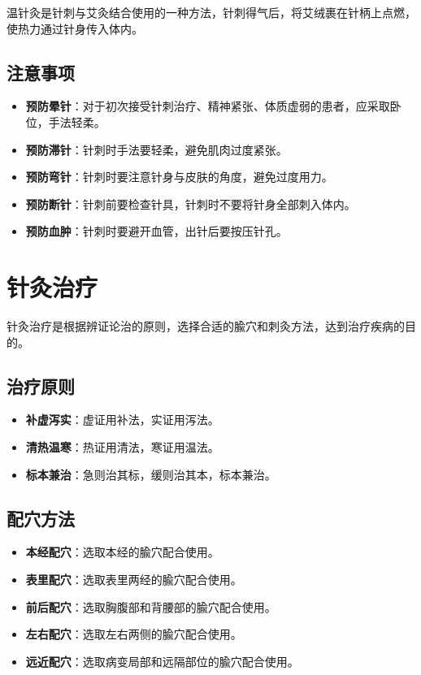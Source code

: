\documentclass[12pt,UTF8]{ctexbook}
\begin{document}
温针灸是针刺与艾灸结合使用的一种方法，针刺得气后，将艾绒裹在针柄上点燃，使热力通过针身传入体内。

\subsection{注意事项}

\begin{itemize}
\item \textbf{预防晕针}：对于初次接受针刺治疗、精神紧张、体质虚弱的患者，应采取卧位，手法轻柔。
\item \textbf{预防滞针}：针刺时手法要轻柔，避免肌肉过度紧张。
\item \textbf{预防弯针}：针刺时要注意针身与皮肤的角度，避免过度用力。
\item \textbf{预防断针}：针刺前要检查针具，针刺时不要将针身全部刺入体内。
\item \textbf{预防血肿}：针刺时要避开血管，出针后要按压针孔。
\end{itemize}

\section{针灸治疗}

针灸治疗是根据辨证论治的原则，选择合适的腧穴和刺灸方法，达到治疗疾病的目的。

\subsection{治疗原则}

\begin{itemize}
\item \textbf{补虚泻实}：虚证用补法，实证用泻法。
\item \textbf{清热温寒}：热证用清法，寒证用温法。
\item \textbf{标本兼治}：急则治其标，缓则治其本，标本兼治。
\end{itemize}

\subsection{配穴方法}

\begin{itemize}
\item \textbf{本经配穴}：选取本经的腧穴配合使用。
\item \textbf{表里配穴}：选取表里两经的腧穴配合使用。
\item \textbf{前后配穴}：选取胸腹部和背腰部的腧穴配合使用。
\item \textbf{左右配穴}：选取左右两侧的腧穴配合使用。
\item \textbf{远近配穴}：选取病变局部和远隔部位的腧穴配合使用。
\end{itemize}
\end{document}
